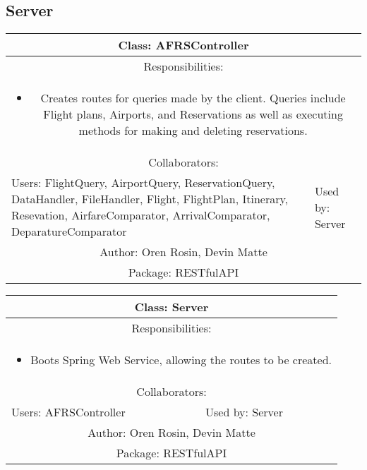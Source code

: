 \subsection{Server}\label{subsec:server}

\begin{center}
    \begin{tabular}{ |p{7cm}|p{7cm}|  }
        \hline
        \multicolumn{2}{|c|}{Class: AFRSController} \\
        \hline
        \multicolumn{2}{|c|}{Responsibilities:} \\ \multicolumn{2}{|c|}{\parbox{0.9\textwidth}{
        \begin{itemize}
            \item Creates routes for queries made by the client. Queries include Flight plans, Airports, and Reservations as well as executing methods for making and deleting reservations.
        \end{itemize} }} \\
        \hline
        \multicolumn{2}{|c|}{Collaborators:} \\
        \hline
        Users: FlightQuery, AirportQuery, ReservationQuery, DataHandler, FileHandler, Flight, FlightPlan, Itinerary, Resevation, AirfareComparator, ArrivalComparator, DeparatureComparator & Used by: Server \\
        \hline
        \multicolumn{2}{|c|}{Author: Oren Rosin, Devin Matte} \\
        \hline
        \multicolumn{2}{|c|}{Package: RESTfulAPI} \\
        \hline
    \end{tabular}
\end{center}

\begin{center}
    \begin{tabular}{ |p{7cm}|p{7cm}|  }
        \hline
        \multicolumn{2}{|c|}{Class: Server} \\
        \hline
        \multicolumn{2}{|c|}{Responsibilities:} \\ \multicolumn{2}{|c|}{\parbox{0.9\textwidth}{
        \begin{itemize}
            \item Boots Spring Web Service, allowing the routes to be created.
        \end{itemize} }} \\
        \hline
        \multicolumn{2}{|c|}{Collaborators:} \\
        \hline
        Users: AFRSController & Used by: Server \\
        \hline
        \multicolumn{2}{|c|}{Author: Oren Rosin, Devin Matte} \\
        \hline
        \multicolumn{2}{|c|}{Package: RESTfulAPI} \\
        \hline
    \end{tabular}
\end{center}

